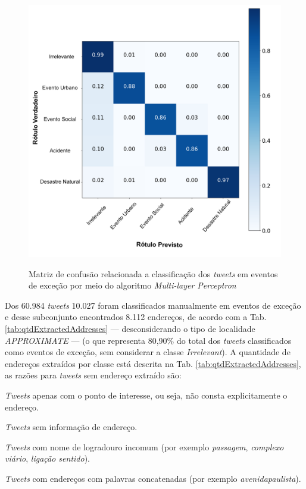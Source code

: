 \documentclass[
	12pt,				%
	oneside,			%
	a4paper,			%
	english,			%
	brazil				%
	]{abntex2ppgsi}
\begin{document}
{{\begin{figure}[!htb]
	\centering
 	  \caption{Matriz de confusão relacionada a classificação dos \textit{tweets} em eventos de exceção por meio do algoritmo \textit{Multi-layer Perceptron}}
		\includegraphics[width=1\linewidth]{images/confusion_matrix_mlp_pt.png}
	\label{fig:confusion_matrix_mlp}
\end{figure}

Dos 60.984 \textit{tweets} 10.027 foram classificados manualmente em eventos de exceção e desse subconjunto encontrados 8.112 endereços, de acordo com a Tab. \ref{tab:qtdExtractedAddresses} --- desconsiderando o tipo de localidade \textit{APPROXIMATE} --- (o que representa 80,90\% do total dos \textit{tweets} classificados como eventos de exceção, sem considerar a classe \textit{Irrelevant}). A quantidade de endereços extraídos por classe está descrita na Tab. \ref{tab:qtdExtractedAddresses}, as razões para \textit {tweets} sem endereço extraído são:

\begin{enumerate*}
\item \textit{Tweets} apenas com o ponto de interesse, ou seja, não consta explicitamente o endereço.
\item \textit{Tweets} sem informação de endereço.
\item \textit{Tweets} com nome de logradouro incomum (por exemplo \emph{passagem}, \emph{complexo viário}, \emph{ligação sentido}).
\item \textit{Tweets} com endereços com palavras concatenadas (por exemplo \emph{avenidapaulista}).
\end{enumerate*}

}}
\end{document}
